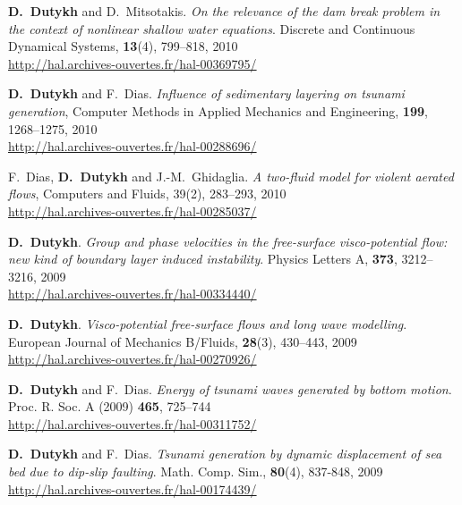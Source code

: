 \begin{etaremune}
  \item \textbf{D.~Dutykh} and D.~Mitsotakis. \textit{On the relevance of the dam break problem in the context of nonlinear shallow water equations}. Discrete and Continuous Dynamical Systems, \textbf{13}(4), 799--818, 2010 \\ %
  \url{http://hal.archives-ouvertes.fr/hal-00369795/}
  
  \item \textbf{D.~Dutykh} and F.~Dias. \textit{Influence of sedimentary layering on tsunami generation}, Computer Methods in Applied Mechanics and Engineering, \textbf{199}, 1268--1275, 2010 \\ %
  \url{http://hal.archives-ouvertes.fr/hal-00288696/}
  
  \item F.~Dias, \textbf{D.~Dutykh} and J.-M.~Ghidaglia. \textit{A two-fluid model for violent aerated flows}, Computers and Fluids, 39(2), 283--293, 2010 \\ %
  \url{http://hal.archives-ouvertes.fr/hal-00285037/}
  
  
  \item \textbf{D.~Dutykh}. \textit{Group and phase velocities in the free-surface visco-potential flow: new kind of boundary layer induced instability}. Physics Letters A, \textbf{373}, 3212--3216, 2009 \\ %
  \url{http://hal.archives-ouvertes.fr/hal-00334440/}
  
  \item \textbf{D.~Dutykh}. \textit{Visco-potential free-surface flows and long wave modelling}. European Journal of Mechanics B/Fluids, \textbf{28}(3), 430--443, 2009 \\ %
  \url{http://hal.archives-ouvertes.fr/hal-00270926/}
  
  \item \textbf{D.~Dutykh} and F.~Dias. \textit{Energy of tsunami waves generated by bottom motion}. Proc. R. Soc. A (2009) \textbf{465}, 725--744 \\ %
  \url{http://hal.archives-ouvertes.fr/hal-00311752/}
  
  \item \textbf{D.~Dutykh} and F.~Dias. \textit{Tsunami generation by dynamic displacement of sea bed due to dip-slip faulting}. Math. Comp. Sim., \textbf{80}(4), 837-848, 2009 \\ %
  \url{http://hal.archives-ouvertes.fr/hal-00174439/}
  

\end{etaremune}
